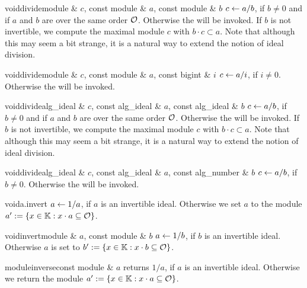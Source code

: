 \begin{fcode}{void}{divide}{module & $c$, const module & $a$, const module & $b$}
  $c \leftarrow a / b$, if $b \neq 0$ and if $a$ and $b$ are over the same order $\mathcal{O}$.  Otherwise
  the \LEH will be invoked.  If $b$ is not invertible, we compute the maximal module $c$ with
  $b\cdot c\subset a$.  Note that although this may seem a bit strange, it is a natural way to
  extend the notion of ideal division.
\end{fcode}

\begin{fcode}{void}{divide}{module & $c$, const module & $a$, const bigint & $i$}
  $c \leftarrow a / i$, if $i \neq 0$.  Otherwise the \LEH will be invoked.
\end{fcode}

\begin{fcode}{void}{divide}{alg_ideal & $c$, const alg_ideal & $a$, const alg_ideal & $b$}
  $c \leftarrow a / b$, if $b \neq 0$ and if $a$ and $b$ are over the same order $\mathcal{O}$.  Otherwise
  the \LEH will be invoked.  If $b$ is not invertible, we compute the maximal module $c$ with
  $b\cdot c\subset a$.  Note that although this may seem a bit strange, it is a natural way to
  extend the notion of ideal division.
\end{fcode}

\begin{fcode}{void}{divide}{alg_ideal & $c$, const alg_ideal & $a$, const alg_number & $b$}
  $c \leftarrow a / b$, if $b \neq 0$.  Otherwise the \LEH will be invoked.
\end{fcode}

\begin{fcode}{void}{a.invert}{}
  $a \leftarrow 1 / a$, if $a$ is an invertible ideal.  Otherwise we set $a$ to the module $a':=\{
  x \in \mathbb{K} : x \cdot a \subseteq \mathcal{O} \}$.
\end{fcode}

\begin{fcode}{void}{invert}{module & $a$, const module & $b$}
  $a \leftarrow 1 / b$, if $b$ is an invertible ideal.  Otherwise $a$ is set to $b':=\{ x \in \mathbb{K}
  : x \cdot b \subseteq \mathcal{O} \}$.
\end{fcode}

\begin{fcode}{module}{inverse}{const module & $a$}
  returns $1 / a$, if $a$ is an invertible ideal.  Otherwise we return the module $a':=\{ x \in
  \mathbb{K} : x \cdot a \subseteq \mathcal{O} \}$.
\end{fcode}

